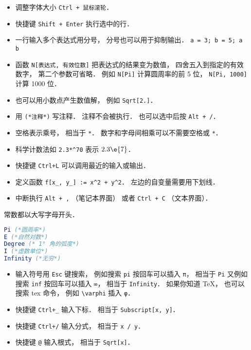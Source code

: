 
\begin{issues}
\issueDraft
\end{issues}


\begin{itemize}
\item 调整字体大小 \verb|Ctrl + 鼠标滚轮|．
\item 快捷键 \verb|Shift + Enter| 执行选中的行．
\item 一行输入多个表达式用分号， 分号也可以用于抑制输出． \verb|a = 3; b = 5; a b|
\item 函数 \verb|N[表达式, 有效位数]| 把表达式的结果变为数值， 四舍五入到指定的有效数字， 第二个参数可省略． 例如 \verb|N[Pi]| 计算圆周率的前 5 位， \verb|N[Pi, 1000]| 计算 1000 位．
\item 也可以用小数点产生数值解， 例如 \verb|Sqrt[2.]|．
\item 用 \verb|(*注释*)| 写注释． 注释不会被执行． 也可以选中后按 \verb|Alt + /|．
\item 空格表示乘号， 相当于 \verb|*|． 数字和字母间相乘可以不需要空格或 \verb|*|．
\item 科学计数法如 \verb|2.3*^70| 表示 $2.3\e{7}$．
\item 快捷键 \verb|Ctrl+L| 可以调用最近的输入或输出．
\item 定义函数 \verb|f[x_, y_] := x^2 + y^2|． 左边的自变量需要用下划线．
\item 中断执行 \verb|Alt + ,| （笔记本界面） 或者 \verb|Ctrl + C| （文本界面）．
\end{itemize}

常数都以大写字母开头．
\begin{lstlisting}[language=Mathematica]
Pi (*圆周率*)
E (*自然对数*)
Degree (* 1° 角的弧度*)
I (*虚数单位*)
Infinity (*无穷*)
\end{lstlisting}

\begin{itemize}
\item 输入符号用 \verb|Esc| 键搜索， 例如搜索 \verb|pi| 按回车可以插入 \verb|π|， 相当于 \verb|Pi| 又例如搜索 \verb|inf| 按回车可以插入 \verb|∞|， 相当于 \verb|Infinity|． 如果你知道 TeX， 也可以搜索 tex 命令， 例如 \verb|\varphi| 插入 \verb|φ|．
\item 快捷键 \verb|Ctrl+_| 输入下标． 相当于 \verb|Subscript[x, y]|．
\item 快捷键 \verb|Ctrl+/| 输入分式， 相当于 \verb|x / y|．
\item 快捷键 \verb|@| 输入根式， 相当于 \verb|Sqrt[x]|．
\end{itemize}

